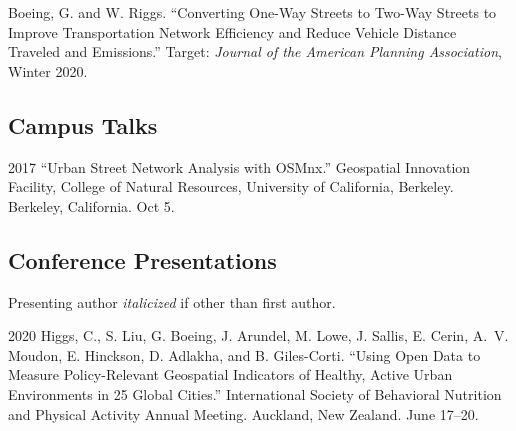 \documentclass[12pt,letterpaper]{report}
\begin{document}
    \begin{tablist}
        
        \item[\the\year] \tab Boeing, G. and W. Riggs. \enquote{Converting One-Way Streets to Two-Way Streets to Improve Transportation Network Efficiency and Reduce Vehicle Distance Traveled and Emissions.} Target: \textit{Journal of the American Planning Association}, Winter 2020.

    \end{tablist}



%
%

    \subsection*{Campus Talks}

    \begin{tablist}

        \item[2017] \tab \enquote{Urban Street Network Analysis with OSMnx.} Geospatial Innovation Facility, College of Natural Resources, University of California, Berkeley. Berkeley, California. Oct 5.

    \end{tablist}

    \subsection*{Conference Presentations}

    Presenting author \textit{italicized} if other than first author.\bigskip

    \begin{tablist}
    	
    	
    	\item[2020] \tab Higgs, C.,  S. Liu, G. Boeing, J. Arundel, M. Lowe, J. Sallis, E. Cerin, A.~V. Moudon, E. Hinckson, D. Adlakha, and B. Giles-Corti. \enquote{Using Open Data to Measure Policy-Relevant Geospatial Indicators of Healthy, Active Urban Environments in 25 Global Cities.} International Society of Behavioral Nutrition and Physical Activity Annual Meeting. Auckland, New Zealand. June 17--20.
    	
    

    \end{tablist}
\end{document}
